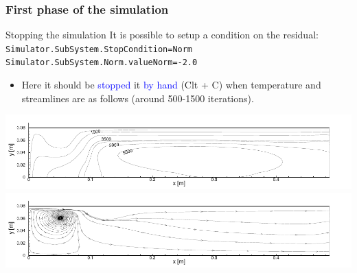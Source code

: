 \documentclass[compress,10pt]{beamer}
\begin{document}
\begin{frame}
\frametitle{First phase of the simulation}
  \begin{block}{Stopping the simulation}
  It is possible to setup a condition on the residual:
  \texttt{\small{Simulator.SubSystem.StopCondition=Norm}}
\texttt{\small{Simulator.SubSystem.Norm.valueNorm=-2.0}}
\begin{itemize}
 \item Here it should be \textcolor{blue}{stopped} it \textcolor{blue}{by hand} (Clt + C) when
temperature and streamlines are as follows (around 500-1500 iterations).  
\end{itemize}
\vspace*{-0.2cm}
 \end{block}
 \includegraphics[width=\textwidth]{torch_T_nc.pdf}\\
\vspace*{-0.2cm}
 \includegraphics[width=\textwidth]{torch_SL_nc.pdf}
 \end{frame}
\end{document}
